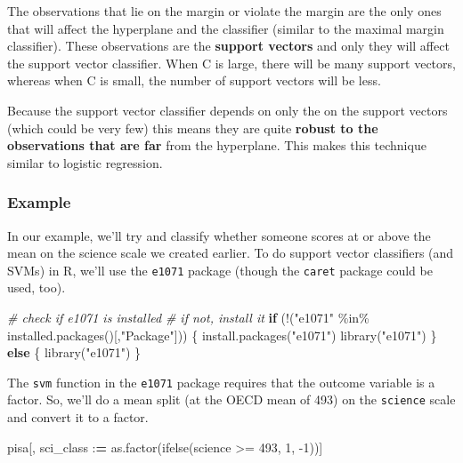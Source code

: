 \documentclass[
]{book}
\newenvironment{Shaded}{\begin{snugshade}}{\end{snugshade}}
\newcommand{\CommentTok}[1]{\textcolor[rgb]{0.56,0.35,0.01}{\textit{#1}}}
\newcommand{\ControlFlowTok}[1]{\textcolor[rgb]{0.13,0.29,0.53}{\textbf{#1}}}
\newcommand{\DecValTok}[1]{\textcolor[rgb]{0.00,0.00,0.81}{#1}}
\newcommand{\ErrorTok}[1]{\textcolor[rgb]{0.64,0.00,0.00}{\textbf{#1}}}
\newcommand{\FunctionTok}[1]{\textcolor[rgb]{0.00,0.00,0.00}{#1}}
\newcommand{\NormalTok}[1]{#1}
\newcommand{\SpecialCharTok}[1]{\textcolor[rgb]{0.00,0.00,0.00}{#1}}
\newcommand{\StringTok}[1]{\textcolor[rgb]{0.31,0.60,0.02}{#1}}
\begin{document}
The observations that lie on the margin or violate the margin are the only ones that will affect the hyperplane and the classifier (similar to the maximal margin classifier). These observations are the \textbf{support vectors} and only they will affect the support vector classifier. When C is large, there will be many support vectors, whereas when C is small, the number of support vectors will be less.

Because the support vector classifier depends on only the on the support vectors (which could be very few) this means they are quite \textbf{robust to the observations that are far} from the hyperplane. This makes this technique similar to logistic regression.

\hypertarget{example}{%
\subsubsection{Example}\label{example}}

In our example, we'll try and classify whether someone scores at or above the mean on the science scale we created earlier. To do support vector classifiers (and SVMs) in R, we'll use the \texttt{e1071} package (though the \texttt{caret} package could be used, too).

\begin{Shaded}
\begin{Highlighting}[]
\CommentTok{\# check if e1071 is installed}
\CommentTok{\# if not, install it}
\ControlFlowTok{if}\NormalTok{ (}\SpecialCharTok{!}\NormalTok{(}\StringTok{"e1071"} \SpecialCharTok{\%in\%} \FunctionTok{installed.packages}\NormalTok{()[,}\StringTok{"Package"}\NormalTok{])) \{}
  \FunctionTok{install.packages}\NormalTok{(}\StringTok{"e1071"}\NormalTok{)}
  \FunctionTok{library}\NormalTok{(}\StringTok{"e1071"}\NormalTok{)}
\NormalTok{\} }\ControlFlowTok{else}\NormalTok{ \{}
  \FunctionTok{library}\NormalTok{(}\StringTok{"e1071"}\NormalTok{)}
\NormalTok{\}}
\end{Highlighting}
\end{Shaded}

The \texttt{svm} function in the \texttt{e1071} package requires that the outcome variable is a factor. So, we'll do a mean split (at the OECD mean of 493) on the \texttt{science} scale and convert it to a factor.

\begin{Shaded}
\begin{Highlighting}[]
\NormalTok{pisa[, sci\_class }\SpecialCharTok{:}\ErrorTok{=} \FunctionTok{as.factor}\NormalTok{(}\FunctionTok{ifelse}\NormalTok{(science }\SpecialCharTok{\textgreater{}=} \DecValTok{493}\NormalTok{, }\DecValTok{1}\NormalTok{, }\SpecialCharTok{{-}}\DecValTok{1}\NormalTok{))]}
\end{Highlighting}
\end{Shaded}
\end{document}
